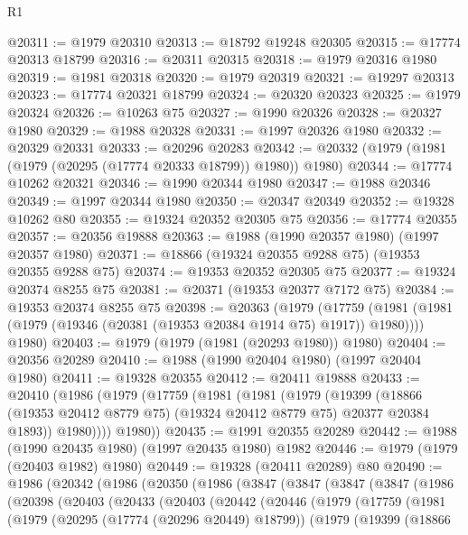 \begin{lexlean}{R1}
\begin{coremodule}
@20311 := @1979 @20310
@20313 := @18792 @19248 @20305
@20315 := @17774 @20313 @18799
@20316 := @20311 @20315
@20318 := @1979 @20316 @1980
@20319 := @1981 @20318
@20320 := @1979 @20319
@20321 := @19297 @20313
@20323 := @17774 @20321 @18799
@20324 := @20320 @20323
@20325 := @1979 @20324
@20326 := @10263 @75
@20327 := @1990 @20326
@20328 := @20327 @1980
@20329 := @1988 @20328
@20331 := @1997 @20326 @1980
@20332 := @20329 @20331
@20333 := @20296 @20283
@20342 := @20332 (@1979 (@1981 (@1979 (@20295 (@17774 @20333 @18799)) @1980)) @1980)
@20344 := @17774 @10262 @20321
@20346 := @1990 @20344 @1980
@20347 := @1988 @20346
@20349 := @1997 @20344 @1980
@20350 := @20347 @20349
@20352 := @19328 @10262 @80
@20355 := @19324 @20352 @20305 @75
@20356 := @17774 @20355
@20357 := @20356 @19888
@20363 := @1988 (@1990 @20357 @1980) (@1997 @20357 @1980)
@20371 := @18866 (@19324 @20355 @9288 @75) (@19353 @20355 @9288 @75)
@20374 := @19353 @20352 @20305 @75
@20377 := @19324 @20374 @8255 @75
@20381 := @20371 (@19353 @20377 @7172 @75)
@20384 := @19353 @20374 @8255 @75
@20398 := @20363
    (@1979
      (@17759 (@1981 (@1981 (@1979 (@19346 (@20381 (@19353 @20384 @1914 @75) @1917)) @1980))))
      @1980)
@20403 := @1979 (@1979 (@1981 (@20293 @1980)) @1980)
@20404 := @20356 @20289
@20410 := @1988 (@1990 @20404 @1980) (@1997 @20404 @1980)
@20411 := @19328 @20355
@20412 := @20411 @19888
@20433 := @20410
    (@1986
      (@1979
        (@17759
          (@1981
            (@1981
              (@1979
                (@19399
                  (@18866 (@19353 @20412 @8779 @75) (@19324 @20412 @8779 @75) @20377 @20384 @1893))
                @1980))))
        @1980))
@20435 := @1991 @20355 @20289
@20442 := @1988 (@1990 @20435 @1980) (@1997 @20435 @1980) @1982
@20446 := @1979 (@1979 (@20403 @1982) @1980)
@20449 := @19328 (@20411 @20289) @80
@20490 := @1986
    (@20342
      (@1986
        (@20350
          (@1986
            (@3847
              (@3847
                (@3847
                  (@3847
                    (@1986
                      (@20398
                        (@20403
                          (@20433
                            (@20403
                              (@20442
                                (@20446
                                  (@1979
                                    (@17759
                                      (@1981
                                        (@1979
                                          (@20295 (@17774 (@20296 @20449) @18799))
                                          (@1979
                                            (@19399
                                              (@18866

\end{coremodule}
\end{lexlean}

